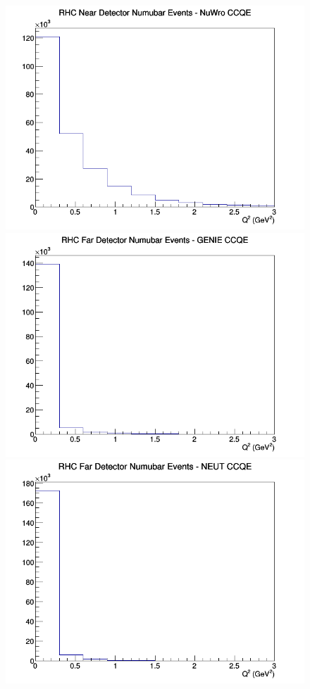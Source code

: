 \documentclass[12pt]{article}
\begin{document}
\begin{figure}[h]
\includegraphics[width=\linewidth]{eff_Q2/GAr/CCQE_RHC_ND_numubar_Q2_NuWro.png}
\endminipage
\newline
{}
\includegraphics[width=\linewidth]{eff_Q2/GAr/CCQE_RHC_FD_numubar_Q2_GENIE.png}
\endminipage
{}
\includegraphics[width=\linewidth]{eff_Q2/GAr/CCQE_RHC_FD_numubar_Q2_NEUT.png}

\end{figure}
\end{document}
